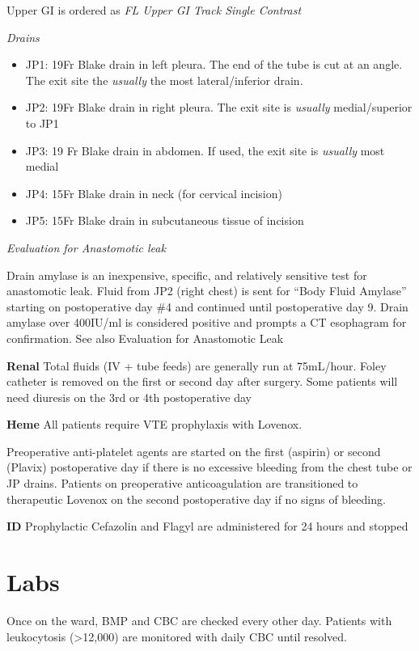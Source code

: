 \documentclass[
  letterpaper,
]{scrbook}
\providecommand{\tightlist}{%
  \setlength{\itemsep}{0pt}\setlength{\parskip}{0pt}}
\begin{document}
Upper GI is ordered as \emph{FL Upper GI Track Single Contrast}

\emph{Drains}

\begin{itemize}
\tightlist
\item
  JP1: 19Fr Blake drain in left pleura. The end of the tube is cut at an
  angle. The exit site the \emph{usually} the most lateral/inferior
  drain.
\item
  JP2: 19Fr Blake drain in right pleura. The exit site is \emph{usually}
  medial/superior to JP1
\item
  JP3: 19 Fr Blake drain in abdomen. If used, the exit site is
  \emph{usually} most medial
\item
  JP4: 15Fr Blake drain in neck (for cervical incision)
\item
  JP5: 15Fr Blake drain in subcutaneous tissue of incision
\end{itemize}

\emph{Evaluation for Anastomotic leak}

Drain amylase is an inexpensive, specific, and relatively sensitive test
for anastomotic leak. Fluid from JP2 (right chest) is sent for ``Body
Fluid Amylase'' starting on postoperative day \#4 and continued until
postoperative day 9. Drain amylase over 400IU/ml is considered positive
and prompts a CT esophagram for confirmation. See also Evaluation for
Anastomotic Leak

\textbf{Renal} Total fluids (IV + tube feeds) are generally run at
75mL/hour. Foley catheter is removed on the first or second day after
surgery. Some patients will need diuresis on the 3rd or 4th
postoperative day

\textbf{Heme} All patients require VTE prophylaxis with Lovenox.

Preoperative anti-platelet agents are started on the first (aspirin) or
second (Plavix) postoperative day if there is no excessive bleeding from
the chest tube or JP drains. Patients on preoperative anticoagulation
are transitioned to therapeutic Lovenox on the second postoperative day
if no signs of bleeding.

\textbf{ID} Prophylactic Cefazolin and Flagyl are administered for 24
hours and stopped

\section{Labs}\label{labs}

Once on the ward, BMP and CBC are checked every other day. Patients with
leukocytosis (\textgreater12,000) are monitored with daily CBC until
resolved.
\end{document}
